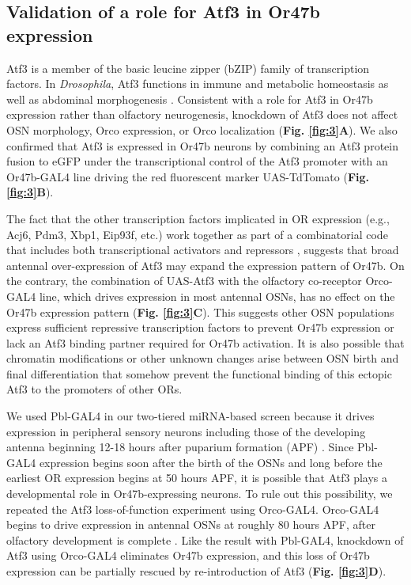 \subsection*{Validation of a role for Atf3 in Or47b expression}

Atf3 is a member of the basic leucine zipper (bZIP) family of transcription factors.
In \emph{Drosophila}, Atf3 functions in immune and metabolic homeostasis as well as abdominal morphogenesis \cite{Brodesser_Jindra_Uhlirova_2012,a_Bohmann_Jindra_Uhlirova_2009}.
Consistent with a role for Atf3 in Or47b expression rather than olfactory neurogenesis, knockdown of Atf3 does not affect OSN morphology, Orco expression, or Orco localization (\textbf{Fig. \ref{fig:3}A}).
We also confirmed that Atf3 is expressed in Or47b neurons by combining an Atf3 protein fusion to eGFP under the transcriptional control of the Atf3 promoter with an Or47b-GAL4 line driving the red fluorescent marker UAS-TdTomato (\textbf{Fig. \ref{fig:3}B}).

The fact that the other transcription factors implicated in OR expression (e.g., Acj6, Pdm3, Xbp1, Eip93f, etc.) work together as part of a combinatorial code that includes both transcriptional activators and repressors \cite{Brochtrup_Hummel_Alenius_2012}, suggests that broad antennal over-expression of Atf3 may expand the expression pattern of Or47b.
On the contrary, the combination of UAS-Atf3 with the olfactory co-receptor Orco-GAL4 line, which drives expression in most antennal OSNs, has no effect on the Or47b expression pattern (\textbf{Fig. \ref{fig:3}C}).
This suggests other OSN populations express sufficient repressive transcription factors to prevent Or47b expression or lack an Atf3 binding partner required for Or47b activation. It is also possible that chromatin modifications or other unknown changes arise between OSN birth and final differentiation that somehow prevent the functional binding of this ectopic Atf3 to the promoters of other ORs.

We used Pbl-GAL4 in our two-tiered miRNA-based screen because it drives expression in peripheral sensory neurons including those of the developing antenna beginning 12-18 hours after puparium formation (APF) \cite{dnik_Dickson_Luo_Komiyama_2007}.
Since Pbl-GAL4 expression begins soon after the birth of the OSNs and long before the earliest OR expression begins at 50 hours APF, it is possible that Atf3 plays a developmental role in Or47b-expressing neurons.
To rule out this possibility, we repeated the Atf3 loss-of-function experiment using Orco-GAL4.
Orco-GAL4 begins to drive expression in antennal OSNs at roughly 80 hours APF, after olfactory development is complete \cite{s_Chiappe_Amrein_Vosshall_2004}.
Like the result with Pbl-GAL4, knockdown of Atf3 using Orco-GAL4 eliminates Or47b expression, and this loss of Or47b expression can be partially rescued by re-introduction of Atf3 (\textbf{Fig. \ref{fig:3}D}).